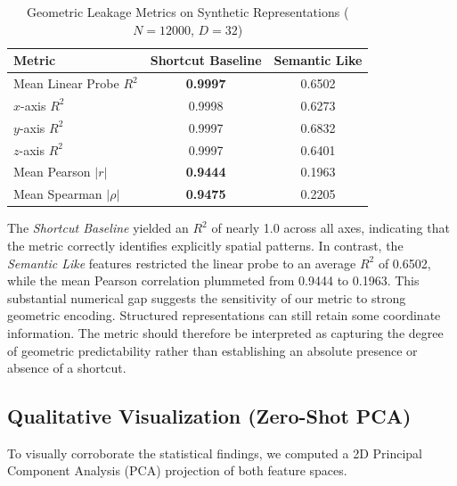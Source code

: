 \documentclass[11pt, a4paper]{article}
\begin{document}
\begin{table}[h]
    \centering
    \begin{tabular}{@{}lcc@{}}
        \toprule
        \textbf{Metric} & \textbf{Shortcut Baseline} & \textbf{Semantic Like} \\ \midrule
        Mean Linear Probe $R^2$ & \textbf{0.9997} & 0.6502 \\
        \hspace{3mm} $x$-axis $R^2$ & 0.9998 & 0.6273 \\
        \hspace{3mm} $y$-axis $R^2$ & 0.9997 & 0.6832 \\
        \hspace{3mm} $z$-axis $R^2$ & 0.9997 & 0.6401 \\ \midrule
        Mean Pearson $|r|$ & \textbf{0.9444} & 0.1963 \\
        Mean Spearman $|\rho|$ & \textbf{0.9475} & 0.2205 \\ \bottomrule
    \end{tabular}
    
    \caption{Geometric Leakage Metrics on Synthetic Representations ($N=12000$, $D=32$)}
    \label{tab:synthetic_metrics}
\end{table}

The \textit{Shortcut Baseline} yielded an $R^2$ of nearly 1.0 across all axes, indicating that the metric correctly identifies explicitly spatial patterns. In contrast, the \textit{Semantic Like} features restricted the linear probe to an average $R^2$ of 0.6502, while the mean Pearson correlation plummeted from 0.9444 to 0.1963. This substantial numerical gap suggests the sensitivity of our metric to strong geometric encoding. Structured representations can still retain some coordinate information. The metric should therefore be interpreted as capturing the degree of geometric predictability rather than establishing an absolute presence or absence of a shortcut.

\subsection{Qualitative Visualization (Zero-Shot PCA)}
To visually corroborate the statistical findings, we computed a 2D Principal Component Analysis (PCA) projection of both feature spaces. 
\end{document}
